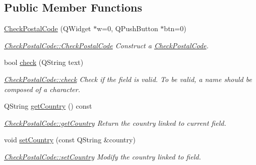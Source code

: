 \subsection*{Public Member Functions}
\begin{DoxyCompactItemize}
\item 
\hyperlink{classGui_1_1Widgets_1_1CheckFields_1_1CheckPostalCode_a31765b09c8742c26ed6b5f38be7b414b}{Check\+Postal\+Code} (Q\+Widget $\ast$w=0, Q\+Push\+Button $\ast$btn=0)
\begin{DoxyCompactList}\small\item\em \hyperlink{classGui_1_1Widgets_1_1CheckFields_1_1CheckPostalCode_a31765b09c8742c26ed6b5f38be7b414b}{Check\+Postal\+Code\+::\+Check\+Postal\+Code} Construct a \hyperlink{classGui_1_1Widgets_1_1CheckFields_1_1CheckPostalCode}{Check\+Postal\+Code}. \end{DoxyCompactList}\item 
bool \hyperlink{classGui_1_1Widgets_1_1CheckFields_1_1CheckPostalCode_a27abf247ec158aafb2c13779f6630449}{check} (Q\+String text)
\begin{DoxyCompactList}\small\item\em \hyperlink{classGui_1_1Widgets_1_1CheckFields_1_1CheckPostalCode_a27abf247ec158aafb2c13779f6630449}{Check\+Postal\+Code\+::check} Check if the field is valid. To be valid, a name should be composed of a character. \end{DoxyCompactList}\item 
Q\+String \hyperlink{classGui_1_1Widgets_1_1CheckFields_1_1CheckPostalCode_a2987b2e62bc39f5c9a56dfce31f429fe}{get\+Country} () const 
\begin{DoxyCompactList}\small\item\em \hyperlink{classGui_1_1Widgets_1_1CheckFields_1_1CheckPostalCode_a2987b2e62bc39f5c9a56dfce31f429fe}{Check\+Postal\+Code\+::get\+Country} Return the country linked to current field. \end{DoxyCompactList}\item 
void \hyperlink{classGui_1_1Widgets_1_1CheckFields_1_1CheckPostalCode_af57970124c6e10b516794f90f2b9f0be}{set\+Country} (const Q\+String \&country)
\begin{DoxyCompactList}\small\item\em \hyperlink{classGui_1_1Widgets_1_1CheckFields_1_1CheckPostalCode_af57970124c6e10b516794f90f2b9f0be}{Check\+Postal\+Code\+::set\+Country} Modify the {\itshape country} linked to field. \end{DoxyCompactList}\end{DoxyCompactItemize}

